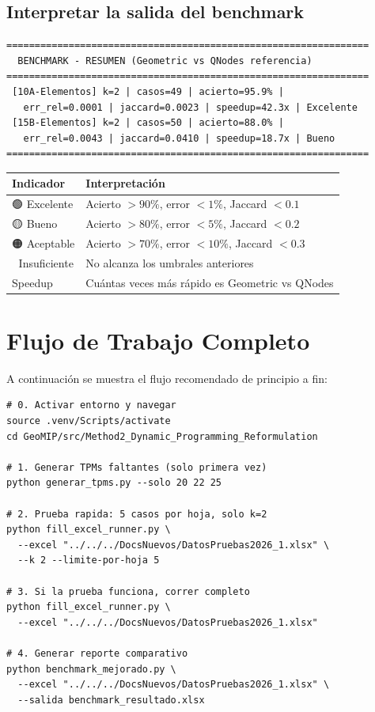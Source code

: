 \documentclass[12pt,a4paper]{article}
\begin{document}
\subsection{Interpretar la salida del benchmark}

\begin{lstlisting}[language={}]
================================================================
  BENCHMARK - RESUMEN (Geometric vs QNodes referencia)
================================================================
 [10A-Elementos] k=2 | casos=49 | acierto=95.9% |
   err_rel=0.0001 | jaccard=0.0023 | speedup=42.3x | Excelente
 [15B-Elementos] k=2 | casos=50 | acierto=88.0% |
   err_rel=0.0043 | jaccard=0.0410 | speedup=18.7x | Bueno
================================================================
\end{lstlisting}

\begin{longtable}{lp{9cm}}
    \toprule
    Indicador & Interpretación \\
    \midrule
    \endhead
    🟢 Excelente & Acierto $>90\%$, error $<1\%$, Jaccard $<0.1$ \\
    🟡 Bueno     & Acierto $>80\%$, error $<5\%$, Jaccard $<0.2$ \\
    🟠 Aceptable & Acierto $>70\%$, error $<10\%$, Jaccard $<0.3$ \\
    🔴 Insuficiente & No alcanza los umbrales anteriores \\
    Speedup & Cuántas veces más rápido es Geometric vs QNodes \\
    \bottomrule
\end{longtable}

\section{Flujo de Trabajo Completo}

A continuación se muestra el flujo recomendado de principio a fin:

\begin{lstlisting}
# 0. Activar entorno y navegar
source .venv/Scripts/activate
cd GeoMIP/src/Method2_Dynamic_Programming_Reformulation

# 1. Generar TPMs faltantes (solo primera vez)
python generar_tpms.py --solo 20 22 25

# 2. Prueba rapida: 5 casos por hoja, solo k=2
python fill_excel_runner.py \
  --excel "../../../DocsNuevos/DatosPruebas2026_1.xlsx" \
  --k 2 --limite-por-hoja 5

# 3. Si la prueba funciona, correr completo
python fill_excel_runner.py \
  --excel "../../../DocsNuevos/DatosPruebas2026_1.xlsx"

# 4. Generar reporte comparativo
python benchmark_mejorado.py \
  --excel "../../../DocsNuevos/DatosPruebas2026_1.xlsx" \
  --salida benchmark_resultado.xlsx
\end{lstlisting}
\end{document}
